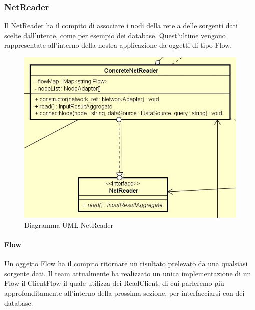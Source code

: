 \subsubsection{NetReader}
Il NetReader ha il compito di associare i nodi della rete a delle sorgenti dati scelte dall'utente, come per esempio dei database. Quest'ultime vengono rappresentate all'interno della nostra applicazione da oggetti di tipo Flow.
\begin{figure} [H]
	\centering
		\includegraphics[scale=0.8]{Img/NetReader}
	\caption{Diagramma UML NetReader}\label{}
\end{figure}
\paragraph{Flow}\Spazio
Un oggetto Flow ha il compito ritornare un risultato prelevato da una qualsiasi sorgente dati.
Il team attualmente ha realizzato un unica implementazione di un Flow il ClientFlow il quale utilizza dei ReadClient, di cui parleremo più approfonditamente all'interno della prossima sezione, per interfacciarsi con dei database.
